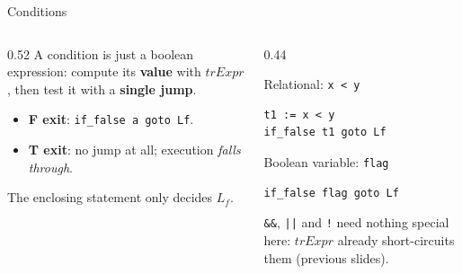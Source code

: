 \documentclass[aspectratio=169,11pt,xcolor=table]{beamer}
\newcommand{\tc}[1]{\texttt{#1}}
\begin{document}
\begin{frame}[fragile]{Conditions}
  \begin{columns}[T]
    \begin{column}{0.52\textwidth}
      \small
      A condition is just a boolean expression: compute its
      \textbf{value} with $\mathit{trExpr}$, then test it with a
      \textbf{single jump}.
      \begin{center}
      \end{center}
      \begin{itemize}
        \item \textbf{F exit}: \tc{if\_false a goto Lf}.
        \item \textbf{T exit}: no jump at all; execution
              \emph{falls through}.
      \end{itemize}
      The enclosing statement only decides $L_f$.
    \end{column}
    \begin{column}{0.44\textwidth}
      \begin{block}{Relational: \tc{x < y}}
        \begin{verbatim}
t1 := x < y
if_false t1 goto Lf
        \end{verbatim}
      \end{block}
      \begin{block}{Boolean variable: \tc{flag}}
        \begin{verbatim}
if_false flag goto Lf
        \end{verbatim}
      \end{block}
      \footnotesize
      \tc{\&\&}, \tc{||} and \tc{!} need nothing special here:
      $\mathit{trExpr}$ already short-circuits them (previous slides).
    \end{column}
  \end{columns}
\end{frame}
\end{document}
